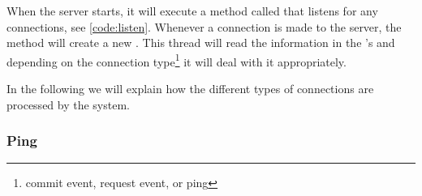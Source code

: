When the server starts, it will execute a method called  that listens for any connections, see \autoref{code:listen}.
Whenever a connection is made to the server, the  method will create a new .
This thread will read the information in the 's  and depending on the connection type\footnote{commit event, request event, or ping} it will deal with it appropriately.



In the following we will explain how the different types of connections are processed by the system.

\subsubsection*{Ping}


